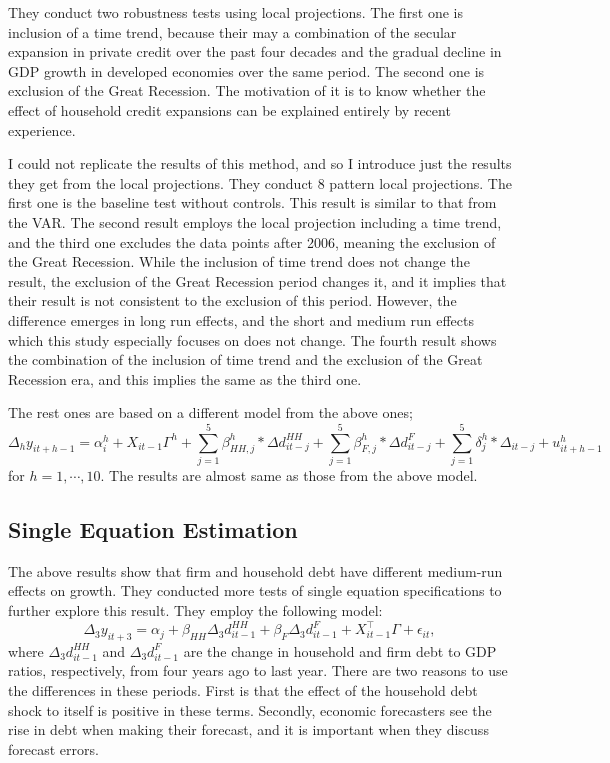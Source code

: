 \documentclass{ltjarticle}
\begin{document}
They conduct two robustness tests using local projections. The first one is inclusion of a time trend, because their may a combination of the secular expansion in private credit over the past four decades and the gradual decline in GDP growth in developed economies over the same period. The second one is exclusion of the Great Recession. The motivation of it is to know whether the effect of household credit expansions can be explained entirely by recent experience.

I could not replicate the results of this method, and so I introduce just the results they get from the local projections. They conduct 8 pattern local projections. The first one is the baseline test without controls. This result is similar to that from the VAR. The second result employs the local projection including a time trend, and the third one excludes the data points after 2006, meaning the exclusion of the Great Recession. While the inclusion of time trend does not change the result, the exclusion of the Great Recession period changes it, and it implies that their result is not consistent to the exclusion of this period. However, the difference emerges in long run effects, and the short and medium run effects which this study especially focuses on does not change. The fourth result shows the combination of the inclusion of time trend and the exclusion of the Great Recession era, and this implies the same as the third one.

The rest ones are based on a different model from the above ones;
\begin{equation*}
    \Delta_{h}y_{it+h-1}=\alpha_{i}^{h}+X_{it-1}\Gamma^{h}+\sum_{j=1}^{5}\beta_{HH,j}^{h}\ast\Delta d_{it-j}^{HH}+\sum_{j=1}^{5}\beta_{F,j}^{h}\ast\Delta d_{it-j}^{F}+\sum_{j=1}^{5}\delta_{j}^{h}\ast\Delta_{it-j}+u_{it+h-1}^{h}
\end{equation*}
for $h=1,\cdots,10$. The results are almost same as those from the above model. 

\subsection{Single Equation Estimation}
The above results show that firm and household debt have different medium-run effects on growth. They conducted more tests of single equation specifications to further  explore this result. They employ the following model:
\begin{equation}
    \label{eq2}
    \Delta_{3}y_{it+3}=\alpha_{j}+\beta_{HH}\Delta_{3}d_{it-1}^{HH}+\beta_{F}\Delta_{3}d_{it-1}^{F}+X_{it-1}^{\top}\Gamma+\epsilon_{it},
\end{equation}
where $\Delta_{3}d_{it-1}^{HH} $ and $\Delta_{3}d_{it-1}^{F}$ are the change in household and firm debt to GDP ratios, respectively, from four years ago to last year. There are two reasons to use the differences in these periods. First is that the effect of the household debt shock to itself is positive in these terms. Secondly, economic forecasters see the rise in debt when making their forecast, and it is important when they discuss forecast errors.
\end{document}
